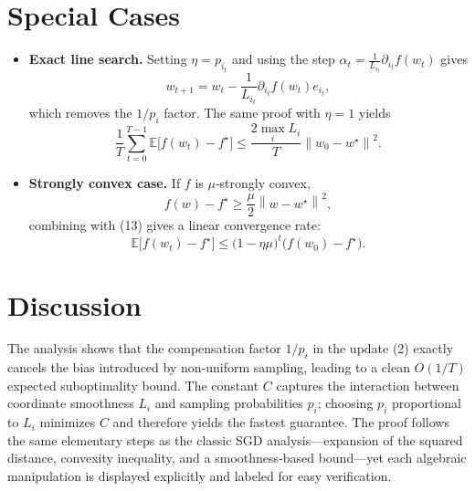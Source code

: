 \documentclass{article}
\newcommand{\E}{\mathbb{E}}
\newcommand{\norm}[1]{\left\|#1\right\|}
\begin{document}
\section*{Special Cases}
\begin{itemize}
\item \textbf{Exact line search.} Setting $\eta=p_{i_t}$ and using the step
$\alpha_t=\frac{1}{L_{i_t}}\partial_{i_t}f(w_t)$ gives
\[
w_{t+1}=w_t-\frac{1}{L_{i_t}}\partial_{i_t}f(w_t)e_{i_t},
\]
which removes the $1/p_i$ factor. The same proof with $\eta=1$ yields
\[
\frac{1}{T}\sum_{t=0}^{T-1}\E\!\bigl[f(w_t)-f^\star\bigr]
\le \frac{2\max_i L_i}{T}\norm{w_0-w^\star}^{2}.
\]

\item \textbf{Strongly convex case.} If $f$ is $\mu$‑strongly convex,
\[
f(w)-f^\star\ge \frac{\mu}{2}\norm{w-w^\star}^{2},
\]
combining with (13) gives a linear convergence rate:
\[
\E\!\bigl[f(w_t)-f^\star\bigr]\le\bigl(1-\eta\mu\bigr)^{t}\bigl(f(w_0)-f^\star\bigr).
\]
\end{itemize}

\section*{Discussion}
The analysis shows that the compensation factor $1/p_i$ in the update (2) exactly cancels the bias introduced by non‑uniform sampling, leading to a clean $O(1/T)$ expected suboptimality bound. The constant $C$ captures the interaction between coordinate smoothness $L_i$ and sampling probabilities $p_i$; choosing $p_i$ proportional to $L_i$ minimizes $C$ and therefore yields the fastest guarantee. The proof follows the same elementary steps as the classic SGD analysis—expansion of the squared distance, convexity inequality, and a smoothness‑based bound—yet each algebraic manipulation is displayed explicitly and labeled for easy verification.
\end{document}
